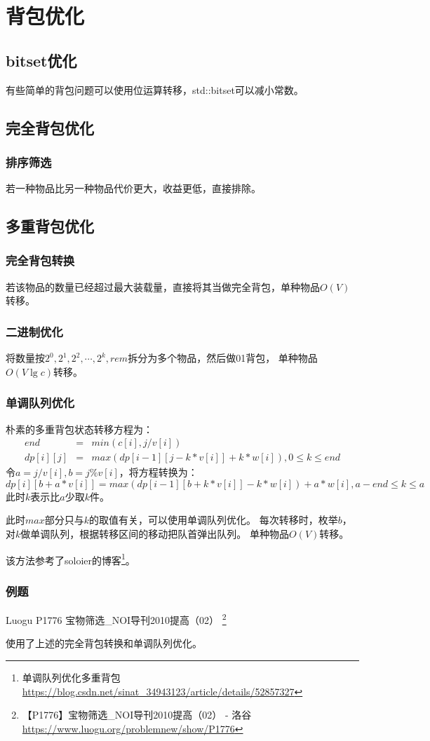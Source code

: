 \section{背包优化}
\subsection{bitset优化}
有些简单的背包问题可以使用位运算转移，std::bitset可以减小常数。
\subsection{完全背包优化}
\subsubsection{排序筛选}
若一种物品比另一种物品代价更大，收益更低，直接排除。
\subsection{多重背包优化}
\subsubsection{完全背包转换}
若该物品的数量已经超过最大装载量，直接将其当做完全背包，单种物品$O(V)$转移。
\subsubsection{二进制优化}
将数量按$2^0,2^1,2^2,\cdots,2^k,rem$拆分为多个物品，然后做01背包，
单种物品$O(V\lg c)$转移。
\subsubsection{单调队列优化}
朴素的多重背包状态转移方程为：
\begin{eqnarray*}
    end&=&min(c[i],j/v[i])\\
    dp[i][j]&=&max(dp[i-1][j-k*v[i]]+k*w[i]),0\leq k \leq end
\end{eqnarray*}
令$a=j/v[i],b=j\%v[i]$，将方程转换为：
\begin{displaymath}
    dp[i][b+a*v[i]]=max(dp[i-1][b+k*v[i]]-k*w[i])+a*w[i],a-end\leq k \leq a
\end{displaymath}
此时$k$表示比$a$少取$k$件。

此时$max$部分只与$k$的取值有关，可以使用单调队列优化。
每次转移时，枚举$b$，对$k$做单调队列，根据转移区间的移动把队首弹出队列。
单种物品$O(V)$转移。

该方法参考了soloier的博客\footnote{单调队列优化多重背包\\
\url{https://blog.csdn.net/sinat\_34943123/article/details/52857327}}。

\subsubsection{例题}
Luogu P1776 宝物筛选\_NOI导刊2010提高（02）
\footnote{【P1776】宝物筛选\_NOI导刊2010提高（02） - 洛谷
\url{https://www.luogu.org/problemnew/show/P1776}}

使用了上述的完全背包转换和单调队列优化。


